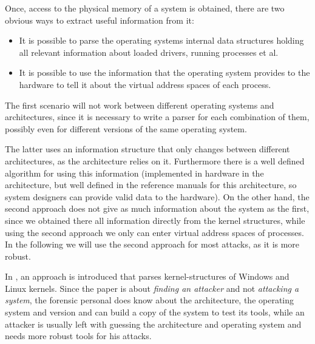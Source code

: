 Once, access to the physical memory of a system is obtained, there are two
obvious ways to extract useful information from it: 
\begin{itemize}

	\item It is possible to parse the operating systems internal data
	structures holding all relevant information about loaded drivers,
	running processes et al.
	
	\item It is possible to use the information that the operating system
	provides to the hardware to tell it about the virtual address spaces of
	each process.
	
\end{itemize}

The first scenario will not work between different operating systems and
architectures, since it is necessary to write a parser for each combination of
them, possibly even for different versions of the same operating system. 

The latter uses an information structure that only changes between different
architectures, as the architecture relies on it. Furthermore there is a well
defined algorithm for using this information (implemented in hardware in the
architecture, but well defined in the reference manuals for this architecture,
so system designers can provide valid data to the hardware). On the other hand,
the second approach does not give as much information about the system as the
first, since we obtained there all information directly from the kernel
structures, while using the second approach we only can enter virtual address
spaces of processes. In the following we will use the second approach for most
attacks, as it is more robust.

In \cite{finding_digital_evidence_in_physical_memory:2006}, an approach is
introduced that parses kernel-structures of Windows and Linux kernels. Since the
paper is about \emph{finding an attacker} and not \emph{attacking a system}, the
forensic personal does know about the architecture, the operating system and
version and can build a copy of the system to test its tools, while an attacker
is usually left with guessing the architecture and operating system and needs
more robust tools for his attacks.%

